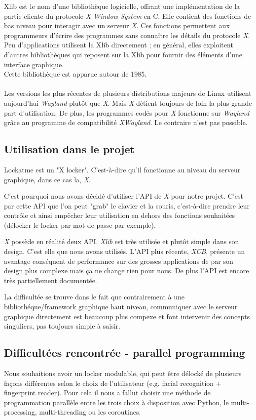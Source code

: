 \documentclass[french]{report}
\begin{document}
Xlib est le nom d'une bibliothèque logicielle, offrant une implémentation de la
partie cliente du protocole \emph{X Window System} en C. Elle contient des fonctions
de bas niveau pour interagir avec un serveur \emph{X}. Ces fonctions permettent aux
programmeurs d'écrire des programmes sans connaître les détails du protocole \emph{X}.
Peu d'applications utilisent la Xlib directement ; en général, elles exploitent
d'autres bibliothèques qui reposent sur la Xlib pour fournir des éléments
d'une interface graphique.\\
Cette bibliothèque est apparue autour de 1985.\\\\
Les versions les plus récentes de plusieurs distributions majeurs de Linux utilisent
aujourd'hui \emph{Wayland} plutôt que \emph{X}. Mais \emph{X} détient toujours de loin la plus
grande part d'utilisation. De plus, les programmes codés pour \emph{X} fonctionne
sur \emph{Wayland} grâce au programme de compatibilité \emph{XWayland}. Le contraire n'est pas
possible.

\subsection{Utilisation dans le projet}

Lockatme est un "X locker". C'est-à-dire qu'il fonctionne au niveau du serveur graphique,
dans ce cas la, \emph{X}.

C'est pourquoi nous avons décidé d'utiliser l'API de \emph{X} pour notre projet. C'est par
cette API que l'on peut "grab" le clavier et la souris, c'est-à-dire prendre leur contrôle
et ainsi empêcher leur utilisation en dehors des fonctions souhaitées (délocker le
locker par mot de passe par exemple).

\emph{X} possède en réalité deux API. \emph{Xlib} est très utilisée et plutôt
simple dans son design.
C'est elle que nous avons utilisés. L'API plus récente, \emph{XCB}, présente un
avantage conséquent de performance sur des grosses applications de par son design
plus complexe mais ça ne change rien pour nous. De plus l'API est encore
très partiellement documentée.

La difficultée se trouve dans le fait que contrairement à une bibliothéque/framework
graphique haut niveau, communiquer avec le serveur graphique directement est
beaucoup plus compexe et font intervenir des concepts singuliers, pas toujours
simple à saisir.

\subsection{Difficultées rencontrée - parallel programming}
Nous souhaitions avoir un locker modulable, qui peut être délocké de plusieurs
façons différentes selon le choix de l'utilisateur (e.g. facial recognition
+ fingerprint reader). Pour cela il nous a fallut choisir une méthode de programmation
parallèle entre les trois choix à disposition avec Python, le multi-processing,
multi-threading ou les coroutines.
\end{document}
